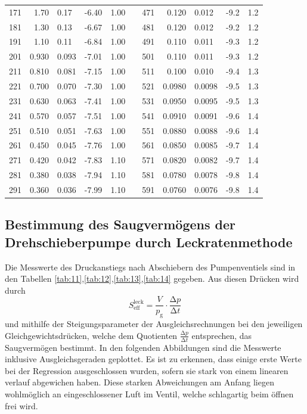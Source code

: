 \begin{table}[H]
\begin{tabular}{|r|r@{\,$\pm$\,}l|r@{\,$\pm$\,}l|p{0.5cm}|r|r@{\,$\pm$\,}l|r@{\,$\pm$\,}l|}
171 & 1.70   & 0.17   & -6.40  & 1.00   & & 471 & 0.120  & 0.012  & -9.2   & 1.2   \\
181 & 1.30   & 0.13   & -6.67  & 1.00   & & 481 & 0.120  & 0.012  & -9.2   & 1.2   \\
191 & 1.10   & 0.11   & -6.84  & 1.00   & & 491 & 0.110  & 0.011  & -9.3   & 1.2   \\
201 & 0.930  & 0.093  & -7.01  & 1.00   & & 501 & 0.110  & 0.011  & -9.3   & 1.2   \\
211 & 0.810  & 0.081  & -7.15  & 1.00   & & 511 & 0.100  & 0.010  & -9.4   & 1.3   \\
221 & 0.700  & 0.070  & -7.30  & 1.00   & & 521 & 0.0980 & 0.0098 & -9.5   & 1.3   \\
231 & 0.630  & 0.063  & -7.41  & 1.00   & & 531 & 0.0950 & 0.0095 & -9.5   & 1.3   \\
241 & 0.570  & 0.057  & -7.51  & 1.00   & & 541 & 0.0910 & 0.0091 & -9.6   & 1.4   \\
251 & 0.510  & 0.051  & -7.63  & 1.00   & & 551 & 0.0880 & 0.0088 & -9.6   & 1.4   \\
261 & 0.450  & 0.045  & -7.76  & 1.00   & & 561 & 0.0850 & 0.0085 & -9.7   & 1.4   \\
271 & 0.420  & 0.042  & -7.83  & 1.10   & & 571 & 0.0820 & 0.0082 & -9.7   & 1.4   \\
281 & 0.380  & 0.038  & -7.94  & 1.10   & & 581 & 0.0780 & 0.0078 & -9.8   & 1.4   \\
291 & 0.360  & 0.036  & -7.99  & 1.10   & & 591 & 0.0760 & 0.0076 & -9.8   & 1.4   \\
\hline
\end{tabular}
\end{table}

\subsection{Bestimmung des Saugvermögens der Drehschieberpumpe durch Leckratenmethode}
Die Messwerte des Druckanstiegs nach Abschiebern des Pumpenventiels sind in den
Tabellen \autoref{tab:11},\autoref{tab:12},\autoref{tab:13},\autoref{tab:14} gegeben. 
Aus diesen Drücken wird durch 
\begin{equation}
  \label{eqn:20}
  S_\text{eff}^\text{leck} = \frac{V}{p_\text{g}} \cdot \frac{\increment p}{\increment t}
\end{equation}
und mithilfe der Steigungsparameter der Ausgleichsrechnungen bei den jeweiligen
Gleichgewichtsdrücken, welche dem Quotienten $\frac{\increment p}{\increment t}$
entsprechen, das Saugvermögen bestimmt. In den folgenden Abbildungen sind die
Messwerte inklusive Ausgleichsgeraden geplottet. Es ist zu erkennen, dass einige
erste Werte bei der Regression ausgeschlossen wurden, sofern sie stark von einem
linearen verlauf abgewichen haben. Diese starken Abweichungen am Anfang liegen
wohlmöglich an eingeschlossener Luft im Ventil, welche schlagartig beim öffnen
frei wird.


